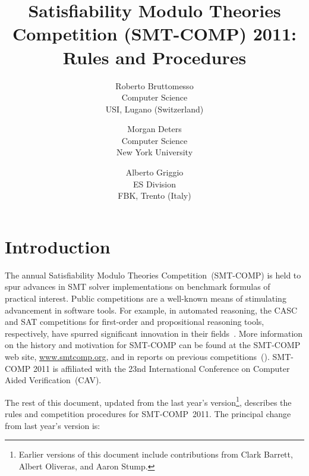 \documentclass[12pt]{article}
\begin{document}
\date{}

\title{Satisfiability Modulo Theories Competition (SMT-COMP) 2011: Rules and 
Procedures
}

\def\doauthor#1{{%
  \hsize.5\hsize \advance\hsize by-1cm %
  \def\\{\hss\egroup\hbox to\hsize\bgroup\strut\hss}%
  \vbox{\hbox to\hsize\bgroup\strut\hss#1\hss\egroup}}}%

\def\header#1{\medskip\noindent\textbf{#1}}

\author{
Roberto Bruttomesso\\
Computer Science\\
USI, Lugano (Switzerland)
\and
Morgan Deters \\
Computer Science \\
New York University \\
\and
Alberto Griggio\\
ES Division\\
FBK, Trento (Italy)
}

\maketitle

\def\eg{\textit{e.g.}}
\def\ie{\textit{i.e.}}

\section{Introduction}
\label{sec:intro}

The annual Satisfiability Modulo Theories Competition~(SMT-COMP) is
held to spur advances in SMT solver implementations on benchmark
formulas of practical interest.  Public competitions are a well-known
means of stimulating advancement in software tools.  For example, in
automated reasoning, the CASC and SAT competitions for first-order and
propositional reasoning tools, respectively, have spurred significant
innovation in their fields~\cite{PSS02,leberre+03}.  More information
on the history and motivation for SMT-COMP can be found at the
SMT-COMP web site, \url{www.smtcomp.org}, and in reports on previous
competitions~(\cite{SMTCOMP-2008,BDOS08,SMTCOMP-FMSD,SMTCOMP-JAR}).
SMT-COMP 2011 is affiliated with the 23nd International
Conference on Computer Aided Verification~(CAV).

The rest of this document, updated from the last year's
version\footnote{Earlier versions of this document include contributions from
Clark Barrett, Albert Oliveras, and Aaron Stump.},
describes the rules and competition procedures for SMT-COMP~2011.
The principal change from last year's version is:
\end{document}
